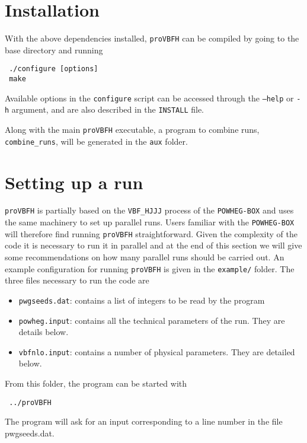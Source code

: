 \documentclass[12pt,a4]{article}
\newcommand{\provbfh}{\texttt{proVBFH}\xspace}
\begin{document}
\section{Installation}
With the above dependencies installed, \provbfh can be compiled by
going to the base directory and running
\begin{verbatim}
 ./configure [options]
 make
\end{verbatim}
Available options in the \texttt{configure} script can be accessed
through the \texttt{--help} or \texttt{-h} argument, and are also
described in the \texttt{INSTALL} file.

Along with the main \provbfh executable, a program to combine runs,
\texttt{combine\_runs}, will be generated in the \texttt{aux} folder.

\section{Setting up a run}
\provbfh is partially based on the \texttt{VBF\_HJJJ} process of the
\texttt{POWHEG-BOX} and uses the same machinery to set up parallel
runs.
%
Users familiar with the \texttt{POWHEG-BOX} will therefore find
running \provbfh straightforward.
%
Given the complexity of the code it is necessary to run it in parallel
and at the end of this section we will give some recommendations on
how many parallel runs should be carried out.
%
An example configuration for running \provbfh is given in the
\texttt{example/} folder.
%
The three files necessary to run the code are
\begin{itemize}
\item \texttt{pwgseeds.dat}: contains a list of integers to be read by
  the program
\item \texttt{powheg.input}: contains all the technical parameters of
  the run. They are details below.
\item \texttt{vbfnlo.input}: contains a number of physical
  parameters. They are detailed below.
\end{itemize}
From this folder, the program can be started with
\begin{verbatim}
 ../proVBFH
\end{verbatim}
%
The program will ask for an input corresponding to a line number in
the file pwgseeds.dat.
\end{document}
